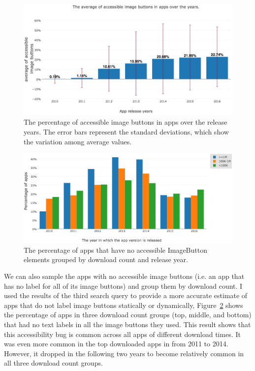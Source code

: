 \begin{figure}[H]
	\includegraphics[scale=0.52]{./figures/findings/accessibility_accessible_image_btns_over_years.png}
	\caption{The percentage of accessible image buttons in apps over the release years. The error bars represent the standard deviations, which show the variation among average values.}
	\label{fig:img_btn_coverage_by_years}
\end{figure}
\begin{figure}[H]
	\includegraphics[scale=0.55]{figures/findings/accessibility_inaccessible_image_btns_by_year_and_download.png}
	\caption{The percentage of apps that have no accessible ImageButton elements grouped by download count and release year.}
	\label{fig:img_btn_no_coverage_by_years}
\end{figure}
We can also sample the apps with no accessible image buttons (i.e. an app that has no label for all of its image buttons) and group them by download count.
I used the results of the third search query to provide a more accurate estimate of apps that do not label image buttons statically or dynamically,
Figure~\ref{fig:img_btn_no_coverage_by_years} shows the percentage of apps in three download count groups (top, middle, and bottom) that had no text labels in all the image buttons they used.
This result shows that this accessibility bug is common across all apps of different download times. 
It was even more common in the top downloaded apps in from 2011 to 2014.
However, it dropped in the following two years to become relatively common in all three download count groups.

